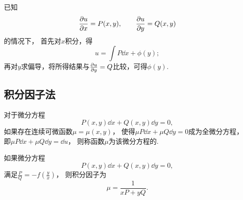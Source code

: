 已知\[
	\pdv{u}{x} = P(x,y),
	\qquad
	\pdv{u}{y} = Q(x,y)
\]的情况下，
首先对\(x\)积分，得\[
	u = \int P \dd{x} + \phi(y);
\]
再对\(y\)求偏导，将所得结果与\(\pdv{u}{y} = Q\)比较，可得\(\phi(y)\).

\subsection{积分因子法}
对于微分方程\[
	P(x,y)\dd{x} + Q(x,y)\dd{y} = 0,
\]
如果存在连续可微函数\(\mu=\mu(x,y)\)，
使得\(\mu P \dd{x} + \mu Q \dd{y} = 0\)成为全微分方程，
即\(\mu P \dd{x} + \mu Q \dd{y} = \dd{u}\)，
则称函数\(\mu\)为该微分方程的.

如果微分方程\[
	P(x,y)\dd{x} + Q(x,y)\dd{y} = 0,
\]
满足\(\frac{P}{Q}=-f\left(\frac{y}{x}\right)\)，
则积分因子为\[
	\mu = \frac{1}{xP+yQ}.
\]
